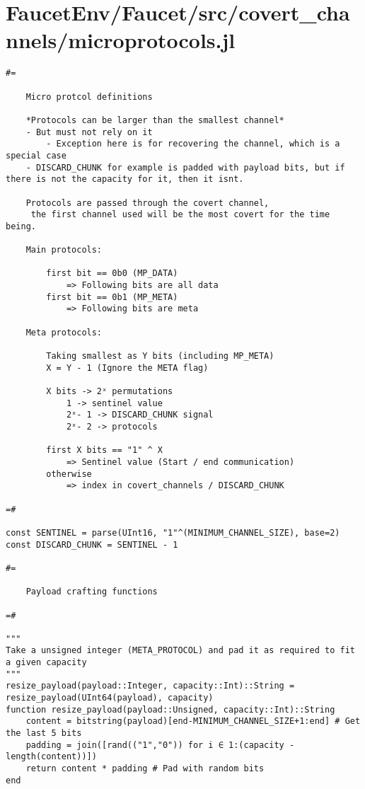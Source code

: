 \section{FaucetEnv/Faucet/src/covert\_channels/microprotocols.jl}
\begin{lstlisting}[language=JuliaLocal, style=julia]
#=

    Micro protcol definitions
    
    *Protocols can be larger than the smallest channel*
    - But must not rely on it
        - Exception here is for recovering the channel, which is a special case
    - DISCARD_CHUNK for example is padded with payload bits, but if there is not the capacity for it, then it isnt.

    Protocols are passed through the covert channel,
     the first channel used will be the most covert for the time being.

    Main protocols:

        first bit == 0b0 (MP_DATA)
            => Following bits are all data
        first bit == 0b1 (MP_META)
            => Following bits are meta
    
    Meta protocols:

        Taking smallest as Y bits (including MP_META)
        X = Y - 1 (Ignore the META flag)

        X bits -> 2ˣ permutations
            1 -> sentinel value
            2ˣ- 1 -> DISCARD_CHUNK signal
            2ˣ- 2 -> protocols
        
        first X bits == "1" ^ X
            => Sentinel value (Start / end communication)
        otherwise
            => index in covert_channels / DISCARD_CHUNK

=#

const SENTINEL = parse(UInt16, "1"^(MINIMUM_CHANNEL_SIZE), base=2)
const DISCARD_CHUNK = SENTINEL - 1

#=

    Payload crafting functions

=# 

"""
Take a unsigned integer (META_PROTOCOL) and pad it as required to fit a given capacity
"""
resize_payload(payload::Integer, capacity::Int)::String = resize_payload(UInt64(payload), capacity)
function resize_payload(payload::Unsigned, capacity::Int)::String
    content = bitstring(payload)[end-MINIMUM_CHANNEL_SIZE+1:end] # Get the last 5 bits
    padding = join([rand(("1","0")) for i ∈ 1:(capacity - length(content))])
    return content * padding # Pad with random bits
end


\end{lstlisting}
